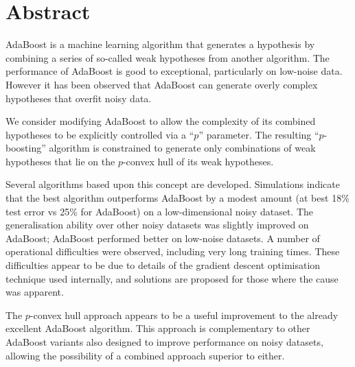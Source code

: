 
\chapter{Abstract}

AdaBoost is a machine learning algorithm that generates a hypothesis
by combining a series of so-called weak hypotheses from another
algorithm.  The performance of AdaBoost is good to exceptional,
particularly on low-noise data.  However it has been observed that
AdaBoost can generate overly complex hypotheses that overfit noisy
data.

We consider modifying AdaBoost to allow the complexity of its combined
hypotheses to be explicitly controlled via a ``$p$'' parameter. 
The resulting ``$p$-boosting'' algorithm is constrained to generate
only combinations of weak hypotheses that lie on the $p$-convex hull
of its weak hypotheses.

Several algorithms based upon this concept are developed.  Simulations
indicate that the best algorithm outperforms AdaBoost by a modest
amount (at best 18\% test error vs 25\% for AdaBoost) on a
low-dimensional noisy dataset.  The generalisation ability over other
noisy datasets was slightly improved on AdaBoost; AdaBoost performed
better on low-noise datasets.  A number of operational difficulties
were observed, including very long training times.  These difficulties
appear to be due to details of the gradient descent optimisation
technique used internally, and solutions are proposed for those where
the cause was apparent. 

The $p$-convex hull approach appears to be a useful improvement to the
already excellent AdaBoost algorithm.  This approach is complementary
to other AdaBoost variants also designed to improve performance on
noisy datasets, allowing the possibility of a combined approach
superior to either.

